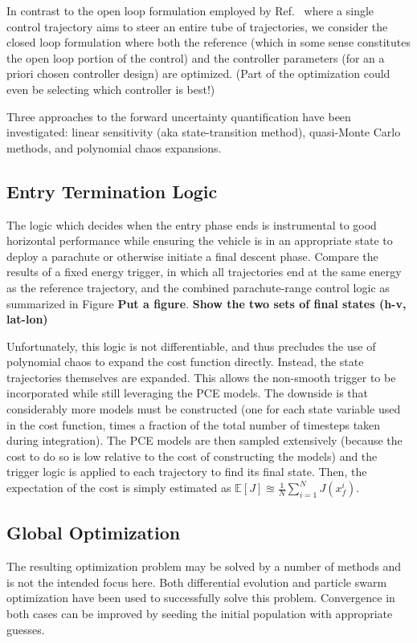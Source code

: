 \documentclass[10pt,a4paper]{article}
\begin{document}
	In contrast to the open loop formulation employed by Ref.~\cite{RSOptimalControl} where a single control trajectory aims to steer an entire tube of trajectories, we consider the closed loop formulation where both the reference (which in some sense constitutes the open loop portion of the control) and the controller parameters (for an a priori chosen controller design) are optimized. (Part of the optimization could even be selecting which controller is best!)		
	
	Three approaches to the forward uncertainty quantification have been investigated: linear sensitivity (aka state-transition method), quasi-Monte Carlo methods, and polynomial chaos expansions.  
			
	\subsection{Entry Termination Logic}
	The logic which decides when the entry phase ends is instrumental to good horizontal performance while ensuring the vehicle is in an appropriate state to deploy a parachute or otherwise initiate a final descent phase. Compare the results of a fixed energy trigger, in which all trajectories end at the same energy as the reference trajectory, and the combined parachute-range control logic as summarized in Figure \textbf{Put a figure}. \textbf{Show the two sets of final states (h-v, lat-lon)}
	
	Unfortunately, this logic is not differentiable, and thus precludes the use of polynomial chaos to expand the cost function directly. Instead, the state trajectories themselves are expanded. This allows the non-smooth trigger to be incorporated while still leveraging the PCE models. The downside is that considerably more models must be constructed (one for each state variable used in the cost function, times a fraction of the total number of timesteps taken during integration). The PCE models are then sampled extensively (because the cost to do so is low relative to the cost of constructing the models) and the trigger logic is applied to each trajectory to find its final state. Then, the expectation of the cost is simply estimated as $\mathbb{E}[J]\approxeq\frac{1}{N}\sum_{i=1}^{N}J(x_f^i)$. 
			
			
	\subsection{Global Optimization}
	The resulting optimization problem may be solved by a number of methods and is not the intended focus here. Both differential evolution and particle swarm optimization have been used to successfully solve this problem. Convergence in both cases can be improved by seeding the initial population with appropriate guesses. 	
	
\end{document}
